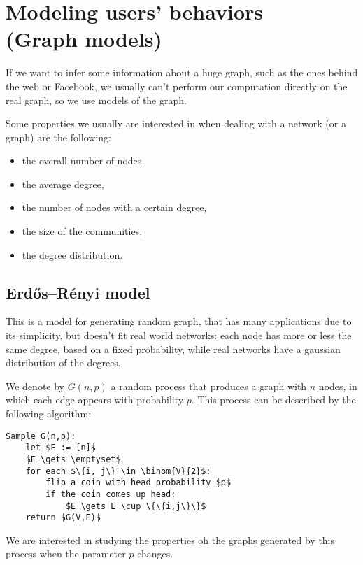 \chapter[Modeling users' behaviors - Graph models]{Modeling users' behaviors \\ \LARGE(Graph models)}\label{sec:users-behaviors}

    If we want to infer some information about a huge graph, such as the ones behind the web or Facebook, we usually can't perform our computation directly on the real graph, so we use models of the graph.

    Some properties we usually are interested in when dealing with a network (or a graph) are the following:
    \begin{itemize}
        \item the overall number of nodes,
        \item the average degree,
        \item the number of nodes with a certain degree,
        \item the size of the communities,
        \item the degree distribution.
    \end{itemize}


\section{Erdős–Rényi model}\label{sec:gnp}
    
    This is a model for generating random graph, that has many applications due to its simplicity, but doesn't fit real world networks: each node has more or less the same degree, based on a fixed probability, while real networks have a gaussian distribution of the degrees.
    
    We denote by $G(n, p)$ a random process that produces a graph with $n$ nodes, in which each edge appears with probability $p$. This process can be described by the following algorithm:
    \begin{lstlisting}[caption={The G(n,p) algorithm},label={lst:gnp}]
Sample G(n,p):
    let $E := [n]$
    $E \gets \emptyset$
    for each $\{i, j\} \in \binom{V}{2}$:
        flip a coin with head probability $p$
        if the coin comes up head:
            $E \gets E \cup \{\{i,j\}\}$
    return $G(V,E)$
    \end{lstlisting}
    
    We are interested in studying the properties oh the graphs generated by this process when the parameter $p$ changes.
    

